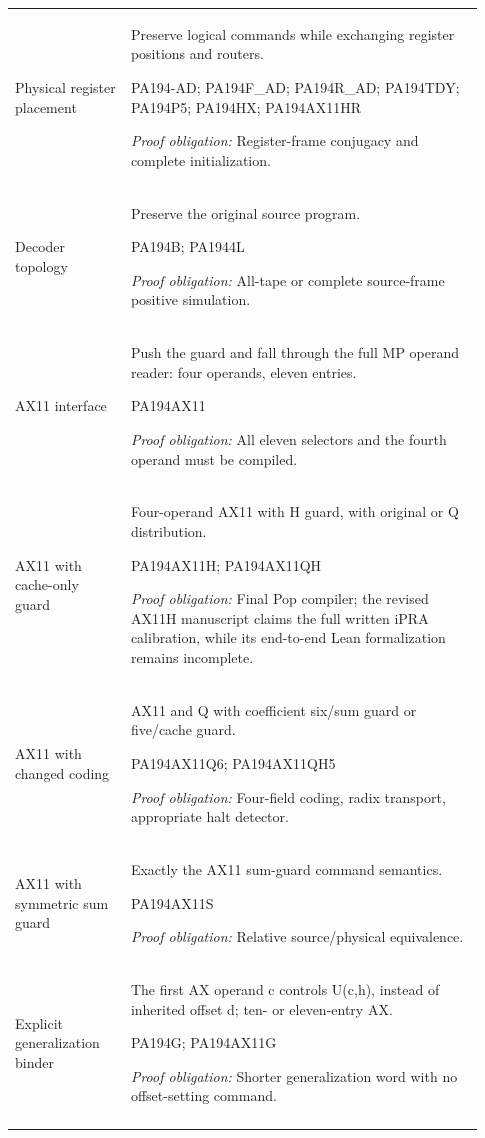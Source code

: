 \begin{longtable}{>{\raggedright\arraybackslash}p{0.23\linewidth}>{\raggedright\arraybackslash}p{0.70\linewidth}}
Physical register placement & Preserve logical commands while exchanging register positions and routers. \par\smallskip PA194-AD; PA194F\_AD; PA194R\_AD; PA194TDY; PA194P5; PA194HX; PA194AX11HR \par\smallskip\emph{Proof obligation:} Register-frame conjugacy and complete initialization.\\\addlinespace[5pt]
Decoder topology & Preserve the original source program. \par\smallskip PA194B; PA1944L \par\smallskip\emph{Proof obligation:} All-tape or complete source-frame positive simulation.\\\addlinespace[5pt]
AX11 interface & Push the guard and fall through the full MP operand reader: four operands, eleven entries. \par\smallskip PA194AX11 \par\smallskip\emph{Proof obligation:} All eleven selectors and the fourth operand must be compiled.\\\addlinespace[5pt]
AX11 with cache-only guard & Four-operand AX11 with H guard, with original or Q distribution. \par\smallskip PA194AX11H; PA194AX11QH \par\smallskip\emph{Proof obligation:} Final Pop compiler; the revised AX11H manuscript claims the full written iPRA calibration, while its end-to-end Lean formalization remains incomplete.\\\addlinespace[5pt]
AX11 with changed coding & AX11 and Q with coefficient six/\allowbreak{}sum guard or five/\allowbreak{}cache guard. \par\smallskip PA194AX11Q6; PA194AX11QH5 \par\smallskip\emph{Proof obligation:} Four-field coding, radix transport, appropriate halt detector.\\\addlinespace[5pt]
AX11 with symmetric sum guard & Exactly the AX11 sum-guard command semantics. \par\smallskip PA194AX11S \par\smallskip\emph{Proof obligation:} Relative source/\allowbreak{}physical equivalence.\\\addlinespace[5pt]
Explicit generalization binder & The first AX operand c controls U(c,h), instead of inherited offset d; ten- or eleven-entry AX. \par\smallskip PA194G; PA194AX11G \par\smallskip\emph{Proof obligation:} Shorter generalization word with no offset-setting command.\\\addlinespace[5pt]

\end{longtable}
